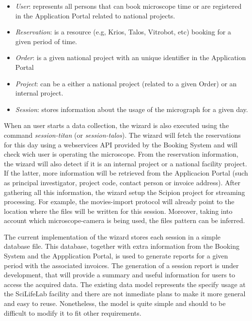 \begin{itemize}
\setlength\itemsep{0em}
 \item \textit{User}: represents all persons that can book microscope time or are registered in the Application Portal 
 related to national projects.
 \item \textit{Reservation}:  is a resource (e.g, Krios, Talos, Vitrobot, etc) booking for a given period of time.
 \item \textit{Order}:  is a given national project with an unique identifier in the Application Portal
 \item \textit{Project}:  can be a either a national project (related to a given Order) or an internal project.
 \item \textit{Session}:  stores information about the usage of the micrograph for a given day.
\end{itemize}

When an user starts a data collection, the wizard is also executed using the command \textit{session-titan} 
(or \textit{session-talos}). The wizard will fetch the reservations for this day using a webservices API provided by 
the Booking System and will check wich user is operating the microscope. From the reservation information, 
the wizard will also detect if it is an internal project or a national facility project. If the latter,
more information will be retrieved from the Applicacion Portal (such as principal investigator, project code, 
contact person or invoice address). After gathering all this information, the wizard setup the Scipion project
for streaming processing. For example, the movies-import protocol will already point to the location where
the files will be written for this session. Moreover, taking into account which microscope-camera is being 
used, the files pattern can be inferred. 

The current implementation of the wizard stores each session in a simple database file. This database, together
with extra information from the Booking System and the Appplication Portal, is used to generate reports for 
a given period with the associated invoices. The generation of a session report is under development, that 
will provide a summary and useful information for users to access the acquired data. The existing data model 
represents the specify usage at the SciLifeLab facility and there are not inmediate plans to make it more 
general and easy to reuse. Nonetheless, the model is quite simple and should to be difficult to modify it to fit 
other requirements. 


